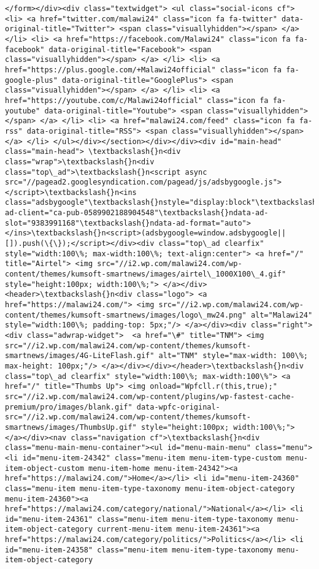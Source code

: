\documentclass[11pt]{article}
\begin{document}
\begin{Verbatim}[commandchars=\\\{\}]
</form></div><div class="textwidget"> <ul class="social-icons cf"> <li> <a href="twitter.com/malawi24" class="icon fa fa-twitter" data-original-title="Twitter"> <span class="visuallyhidden"></span> </a> </li> <li> <a href="https://facebook.com/Malawi24" class="icon fa fa-facebook" data-original-title="Facebook"> <span class="visuallyhidden"></span> </a> </li> <li> <a href="https://plus.google.com/+Malawi24official" class="icon fa fa-google-plus" data-original-title="GooglePlus"> <span class="visuallyhidden"></span> </a> </li> <li> <a href="https://youtube.com/c/Malawi24official" class="icon fa fa-youtube" data-original-title="Youtube"> <span class="visuallyhidden"></span> </a> </li> <li> <a href="malawi24.com/feed" class="icon fa fa-rss" data-original-title="RSS"> <span class="visuallyhidden"></span> </a> </li> </ul></div></section></div></div><div id="main-head" class="main-head"> \textbackslash{}n<div class="wrap">\textbackslash{}n<div class="top\_ad">\textbackslash{}n<script async src="//pagead2.googlesyndication.com/pagead/js/adsbygoogle.js"></script>\textbackslash{}n<ins class="adsbygoogle"\textbackslash{}nstyle="display:block"\textbackslash{}ndata-ad-client="ca-pub-0589902188904548"\textbackslash{}ndata-ad-slot="9383991168"\textbackslash{}ndata-ad-format="auto"></ins>\textbackslash{}n<script>(adsbygoogle=window.adsbygoogle||[]).push(\{\});</script></div><div class="top\_ad clearfix" style="width:100\%; max-width:100\%; text-align:center"> <a href="/" title="Airtel"> <img src="//i2.wp.com/malawi24.com/wp-content/themes/kumsoft-smartnews/images/airtel\_1000X100\_4.gif" style="height:100px; width:100\%;"> </a></div><header>\textbackslash{}n<div class="logo"> <a href="https://malawi24.com/"> <img src="//i2.wp.com/malawi24.com/wp-content/themes/kumsoft-smartnews/images/logo\_mw24.png" alt="Malawi24" style="width:100\%; padding-top: 5px;"/> </a></div><div class="right"> <div class="adwrap-widget">  <a href="\#" title="TNM"> <img src="//i2.wp.com/malawi24.com/wp-content/themes/kumsoft-smartnews/images/4G-LiteFlash.gif" alt="TNM" style="max-width: 100\%; max-height: 100px;"/> </a></div></div></header>\textbackslash{}n<div class="top\_ad clearfix" style="width:100\%; max-width:100\%"> <a href="/" title="Thumbs Up"> <img onload="Wpfcll.r(this,true);" src="//i2.wp.com/malawi24.com/wp-content/plugins/wp-fastest-cache-premium/pro/images/blank.gif" data-wpfc-original-src="//i2.wp.com/malawi24.com/wp-content/themes/kumsoft-smartnews/images/ThumbsUp.gif" style="height:100px; width:100\%;"> </a></div><nav class="navigation cf">\textbackslash{}n<div class="menu-main-menu-container"><ul id="menu-main-menu" class="menu"><li id="menu-item-24342" class="menu-item menu-item-type-custom menu-item-object-custom menu-item-home menu-item-24342"><a href="https://malawi24.com/">Home</a></li> <li id="menu-item-24360" class="menu-item menu-item-type-taxonomy menu-item-object-category menu-item-24360"><a href="https://malawi24.com/category/national/">National</a></li> <li id="menu-item-24361" class="menu-item menu-item-type-taxonomy menu-item-object-category current-menu-item menu-item-24361"><a href="https://malawi24.com/category/politics/">Politics</a></li> <li id="menu-item-24358" class="menu-item menu-item-type-taxonomy menu-item-object-category 
\end{Verbatim}
\end{document}
